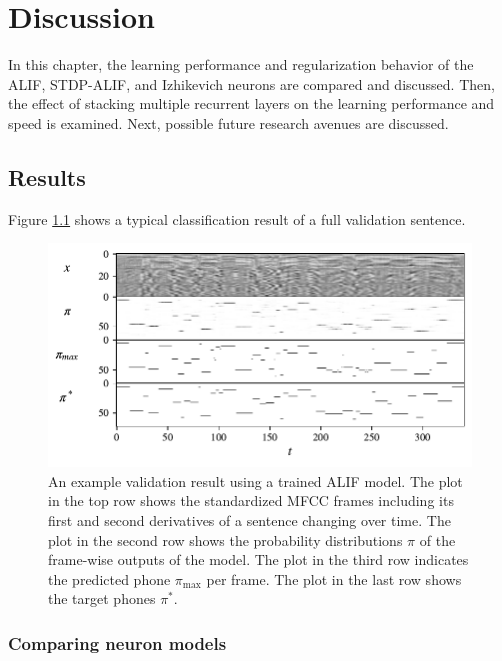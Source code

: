 \chapter{Discussion}\label{ch:discussion}
In this chapter, the learning performance and regularization behavior of the ALIF, STDP-ALIF, and Izhikevich neurons are compared and discussed.
Then, the effect of stacking multiple recurrent layers on the learning performance and speed is examined.
Next, possible future research avenues are discussed.
\section{Results}\label{sec:results}

	Figure \ref{fig:inoutpair} shows a typical classification result of a full validation sentence.

	\begin{figure}[ht]
	    \myfloatalign
	    \includegraphics[width=\linewidth]{gfx/InOutPair}
	    \caption[Input/output/target example]{An example validation result using a trained ALIF model. The plot in the top row shows the standardized MFCC frames including its first and second derivatives of a sentence changing over time. The plot in the second row shows the probability distributions $\pi$ of the frame-wise outputs of the model. The plot in the third row indicates the predicted phone $\pi_\text{max}$ per frame. The plot in the last row shows the target phones $\pi^*$.}
	    \label{fig:inoutpair}
	  \end{figure}
	\subsection{Comparing neuron models}

